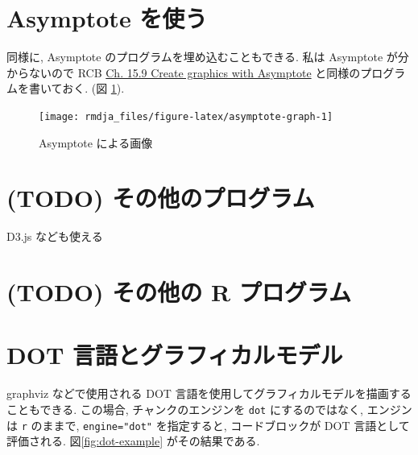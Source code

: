 \documentclass[
]{bxjsbook}
\theoremstyle{definition}
\theoremstyle{definition}
\theoremstyle{definition}
\theoremstyle{remark}
\begin{document}
\hypertarget{asymptote-ux3092ux4f7fux3046}{%
\section{Asymptote を使う}\label{asymptote-ux3092ux4f7fux3046}}

同様に, Asymptote のプログラムを埋め込むこともできる. 私は Asymptote
が分からないので RCB
\href{https://bookdown.org/yihui/rmarkdown-cookbook/eng-asy.html}{Ch.
15.9 Create graphics with Asymptote} と同様のプログラムを書いておく. (図
\ref{fig:asymptote-graph}).

\begin{figure}

{\centering \texttt{[image: rmdja\_files/figure-latex/asymptote-graph-1]} 

}

\caption{Asymptote による画像}\label{fig:asymptote-graph}
\end{figure}

\hypertarget{todo-ux305dux306eux4ed6ux306eux30d7ux30edux30b0ux30e9ux30e0}{%
\section{(TODO)
その他のプログラム}\label{todo-ux305dux306eux4ed6ux306eux30d7ux30edux30b0ux30e9ux30e0}}

D3.js なども使える

\hypertarget{todo-ux305dux306eux4ed6ux306e-r-ux30d7ux30edux30b0ux30e9ux30e0}{%
\section{(TODO) その他の R
プログラム}\label{todo-ux305dux306eux4ed6ux306e-r-ux30d7ux30edux30b0ux30e9ux30e0}}

\hypertarget{dot-ux8a00ux8a9eux3068ux30b0ux30e9ux30d5ux30a3ux30abux30ebux30e2ux30c7ux30eb}{%
\section{DOT
言語とグラフィカルモデル}\label{dot-ux8a00ux8a9eux3068ux30b0ux30e9ux30d5ux30a3ux30abux30ebux30e2ux30c7ux30eb}}

graphviz などで使用される DOT
言語を使用してグラフィカルモデルを描画することもできる. この場合,
チャンクのエンジンを \texttt{dot} にするのではなく, エンジンは
\texttt{r} のままで, \texttt{engine="dot"} を指定すると,
コードブロックが DOT 言語として評価される. 図\ref{fig:dot-example}
がその結果である.
\end{document}
